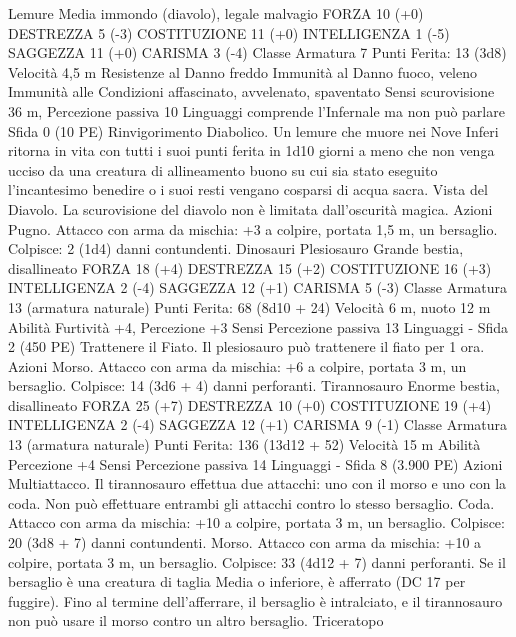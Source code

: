 \begin{multicols}{2}
Lemure
Media immondo (diavolo), legale malvagio
FORZA 10 (+0)
DESTREZZA 5 (-3)
COSTITUZIONE 11 (+0)
INTELLIGENZA 1 (-5)
SAGGEZZA 11 (+0)
CARISMA 3 (-4)
Classe Armatura 7
\hspace*{0pt}\hfill{Punti Ferita}: 13 (3d8)
Velocità 4,5 m
Resistenze al Danno freddo
Immunità al Danno fuoco, veleno
Immunità alle Condizioni affascinato, avvelenato, spaventato
Sensi scurovisione 36 m, Percezione passiva 10
Linguaggi comprende l’Infernale ma non può parlare
Sfida 0 (10 PE)
Rinvigorimento Diabolico. Un lemure che muore nei Nove
Inferi ritorna in vita con tutti i suoi punti ferita in 1d10 giorni a
meno che non venga ucciso da una creatura di allineamento
buono su cui sia stato eseguito l’incantesimo benedire o i suoi
resti vengano cosparsi di acqua sacra.
Vista del Diavolo. La scurovisione del diavolo non è limitata
dall’oscurità magica.
Azioni
Pugno. Attacco con arma da mischia: +3 a colpire, portata 1,5
m, un bersaglio.
Colpisce: 2 (1d4) danni contundenti.
Dinosauri
Plesiosauro
Grande bestia, disallineato
FORZA 18 (+4)
DESTREZZA 15 (+2)
COSTITUZIONE 16 (+3)
INTELLIGENZA 2 (-4)
SAGGEZZA 12 (+1)
CARISMA 5 (-3)
Classe Armatura 13 (armatura naturale)
\hspace*{0pt}\hfill{Punti Ferita}: 68 (8d10 + 24)
Velocità 6 m, nuoto 12 m
Abilità Furtività +4, Percezione +3
Sensi Percezione passiva 13
Linguaggi -
Sfida 2 (450 PE)
Trattenere il Fiato. Il plesiosauro può trattenere il fiato per 1
ora.
Azioni
Morso. Attacco con arma da mischia: +6 a colpire, portata 3 m,
un bersaglio.
Colpisce: 14 (3d6 + 4) danni perforanti.
Tirannosauro
Enorme bestia, disallineato
FORZA 25 (+7)
DESTREZZA 10 (+0)
COSTITUZIONE 19 (+4)
INTELLIGENZA 2 (-4)
SAGGEZZA 12 (+1)
CARISMA 9 (-1)
Classe Armatura 13 (armatura naturale)
\hspace*{0pt}\hfill{Punti Ferita}: 136 (13d12 + 52)
Velocità 15 m
Abilità Percezione +4
Sensi Percezione passiva 14
Linguaggi -
Sfida 8 (3.900 PE)
Azioni
Multiattacco. Il tirannosauro effettua due attacchi: uno con il
morso e uno con la coda. Non può effettuare entrambi gli
attacchi contro lo stesso bersaglio.
Coda. Attacco con arma da mischia: +10 a colpire, portata 3 m,
un bersaglio.
Colpisce: 20 (3d8 + 7) danni contundenti.
Morso. Attacco con arma da mischia: +10 a colpire, portata 3 m,
un bersaglio.
Colpisce: 33 (4d12 + 7) danni perforanti. Se il bersaglio è una
creatura di taglia Media o inferiore, è afferrato (DC 17 per
fuggire). Fino al termine dell’afferrare, il bersaglio è intralciato,
e il tirannosauro non può usare il morso contro un altro bersaglio.
Triceratopo

\end{multicols}
